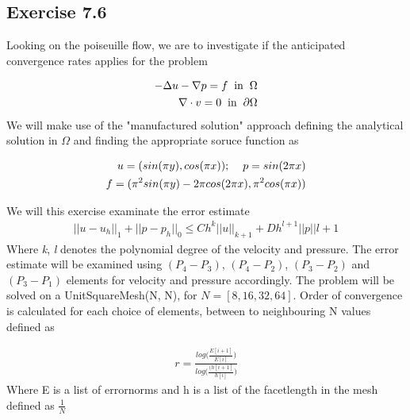 \documentclass[a4paper,norsk]{article}
\begin{document}
\newpage
\subsection{Exercise 7.6}
Looking on the poiseuille flow, we are to investigate if the anticipated convergence rates applies for the problem

\begin{align*}
-\Delta u - \nabla p = f \hspace{2mm} \text{in} \hspace{2mm} \Omega \\
\nabla \cdot v = 0 \hspace{2mm} \text{in} \hspace{2mm} \partial\Omega \\
\end{align*}
We will make use of the "manufactured solution" approach defining the analytical solution in $\Omega$ and finding the appropriate
soruce function as

\begin{align*}
 u = (sin(\pi y), cos(\pi x)); \hspace{4mm} p = sin(2 \pi x) \\
 f = (\pi^2 sin(\pi y) - 2 \pi cos(2 \pi x), \pi^2 cos(\pi x)) 
\end{align*}

We will this exercise examinate the error estimate 
\begin{align*}
 ||u - u_h||_1 + ||p - p_h||_0 \leq Ch^k||u||_{k+1} + Dh^{l+1} ||p||{l+1}
\end{align*}
Where \textit{k}, \textit{l} denotes the polynomial degree of the velocity and pressure. The error estimate will be
examined using $(P_4 - P_3)$, $(P_4 - P_2)$, $(P_3 - P_2)$ and $(P_3 - P_1)$ elements for velocity and pressure accordingly. 
The problem will be solved on a UnitSquareMesh(N, N), for $N = [8, 16, 32, 64]$. Order of convergence is calculated for each choice
of elements, between to neighbouring N values defined as

\begin{align*}
 r  = \frac{log \big( \frac{E[i+1]}{E[i]} \big)} {log \big( \frac{(h[i+1]}{h[i]} \big)}
\end{align*}
Where E is a list of errornorms and h is a list of the facetlength in the mesh defined as $\frac{1}{N}$
\end{document}
